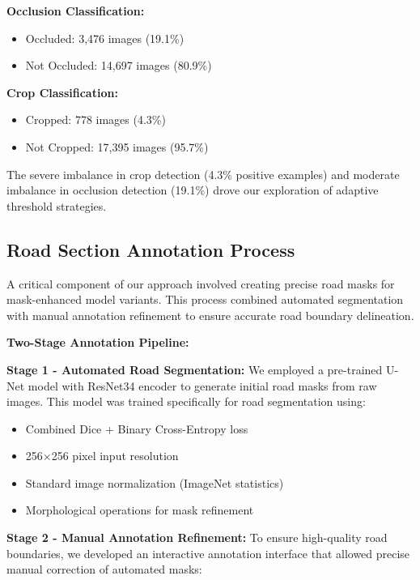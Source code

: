 \documentclass[12pt]{article}
\begin{document}
\textbf{Occlusion Classification:}
\begin{itemize}[itemsep=1pt,parsep=0pt,topsep=2pt]
\item Occluded: 3,476 images (19.1\%)
\item Not Occluded: 14,697 images (80.9\%)
\end{itemize}

\textbf{Crop Classification:}
\begin{itemize}[itemsep=1pt,parsep=0pt,topsep=2pt]
\item Cropped: 778 images (4.3\%)
\item Not Cropped: 17,395 images (95.7\%)
\end{itemize}

The severe imbalance in crop detection (4.3\% positive examples) and moderate imbalance in occlusion detection (19.1\%) drove our exploration of adaptive threshold strategies.

\subsection{Road Section Annotation Process}

A critical component of our approach involved creating precise road masks for mask-enhanced model variants. This process combined automated segmentation with manual annotation refinement to ensure accurate road boundary delineation.

\textbf{Two-Stage Annotation Pipeline:}

\textbf{Stage 1 - Automated Road Segmentation:} We employed a pre-trained U-Net model with ResNet34 encoder to generate initial road masks from raw images. This model was trained specifically for road segmentation using:
\begin{itemize}[itemsep=1pt,parsep=0pt,topsep=2pt]
\item Combined Dice + Binary Cross-Entropy loss
\item 256×256 pixel input resolution
\item Standard image normalization (ImageNet statistics)
\item Morphological operations for mask refinement
\end{itemize}

\textbf{Stage 2 - Manual Annotation Refinement:} To ensure high-quality road boundaries, we developed an interactive annotation interface that allowed precise manual correction of automated masks:
\end{document}
